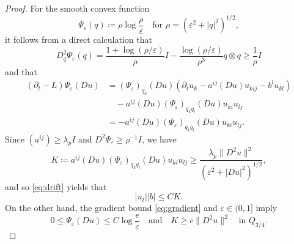 \documentclass[a4paper,11pt]{amsart}
\theoremstyle{plain}
\theoremstyle{definition}
\numberwithin{equation}{section}
\begin{document}
\begin{proof}
For the smooth convex function
\begin{equation*}
\Psi_\varepsilon(q)\coloneqq\rho\log\frac\rho\varepsilon \quad \text{for $\rho=(\varepsilon^2+|q|^2)^{1/2}$},
\end{equation*}
it follows from a direct calculation that
\begin{equation*}
    D^2_q\Psi_{\varepsilon}(q)=\frac{1+\log(\rho/\varepsilon)}{\rho}I-\frac{\log(\rho/\varepsilon)}{\rho^3}q \otimes q \geq \frac{1}{\rho}I
\end{equation*}
and that
\begin{equation*}
    \begin{aligned}
        (\partial_t-L)\Psi_\varepsilon(Du)&=(\Psi_{\varepsilon})_{q_k}(Du) (\partial_t u_k-a^{ij}(Du)u_{kij}-b^lu_{kl}) \\
        &\quad-a^{ij}(Du)(\Psi_\varepsilon)_{q_kq_l}(Du)u_{ki}u_{lj}\\
        &=-a^{ij}(Du)(\Psi_\varepsilon)_{q_kq_l}(Du)u_{ki}u_{lj}.
    \end{aligned}
\end{equation*}
Since $(a^{ij}) \geq \lambda_pI$ and $D^2\Psi_{\varepsilon} \geq \rho^{-1}I$, we have
\begin{equation*}   
        K \coloneqq a^{ij}(Du)(\Psi_\varepsilon)_{q_kq_l}(Du)u_{ki}u_{lj}\geq\frac{\lambda_p\|D^2u\|^2}{(\varepsilon^2+|Du|^2)^{1/2}},
\end{equation*}
and so \eqref{eq:drift} yields that
\begin{equation}\label{eq:absorb}
 |u_t||b|\leq CK.
\end{equation}
On the other hand, the gradient bound \eqref{eq:gradient} and $\varepsilon \in (0,1]$ imply
\begin{equation*}
     0\leq\Psi_\varepsilon(Du)\leq C\log\frac e\varepsilon \quad \text{and} \quad 
     K\geq c\|D^2u\|^2 \quad\text{in $Q_{3/4}$}.
\end{equation*}


\end{proof}
\end{document}
